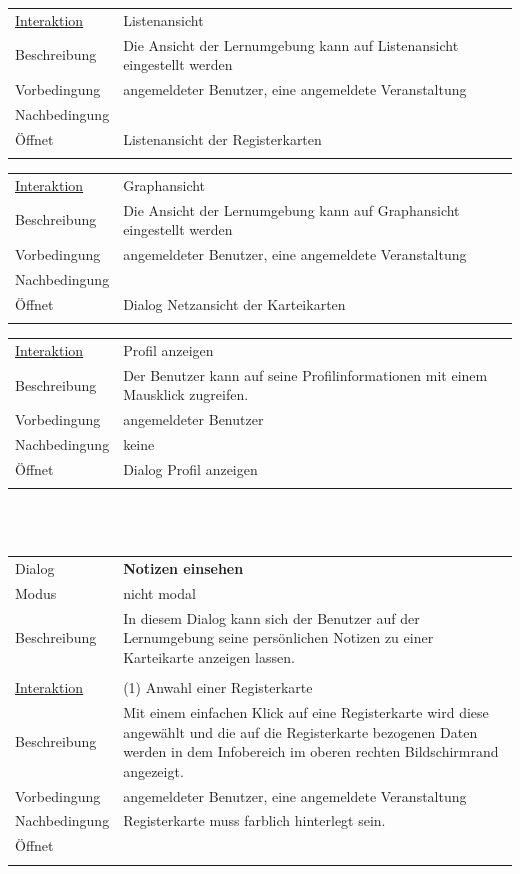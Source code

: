 \documentclass[12pt,a4paper]{article}
\begin{document}
{\begin{tabular}{l p{12cm}}
\underline{Interaktion}  	 & Listenansicht\\ 
Beschreibung   	 			 & Die Ansicht der Lernumgebung kann auf  Listenansicht eingestellt werden\\
Vorbedingung				 & angemeldeter Benutzer, eine angemeldete Veranstaltung \\
Nachbedingung				 & \\
Öffnet						 & \glqq Listenansicht der Registerkarten\grqq \\\\
\end{tabular}
\begin{tabular}{l p{12cm}}
\underline{Interaktion}  	 & Graphansicht\\ 
Beschreibung   				 & Die Ansicht der Lernumgebung kann auf  Graphansicht eingestellt werden  \\
Vorbedingung				 & angemeldeter Benutzer, eine angemeldete Veranstaltung \\
Nachbedingung				 & \\
Öffnet			 			 & \glqq Dialog Netzansicht der Karteikarten\grqq \\\\\end{tabular}

\begin{tabular}{l p{12cm}}
\underline{Interaktion}  	 & Profil anzeigen\\ 
Beschreibung   	 & Der Benutzer kann auf seine Profilinformationen mit einem Mausklick zugreifen. \\
Vorbedingung	 & angemeldeter Benutzer\\
Nachbedingung	 & keine \\
Öffnet			 & \glqq Dialog Profil anzeigen\grqq \\\\
\end{tabular}\\\\




\begin{tabular}{l p{12cm}}
Dialog 	 & \textbf{Notizen einsehen} \\ 
Modus & nicht modal\\ 
Beschreibung   	 & In diesem Dialog kann sich der Benutzer auf der Lernumgebung seine persönlichen Notizen zu einer Karteikarte anzeigen lassen. \\\\

\underline{Interaktion}  	 & (1) Anwahl einer Registerkarte\\ 
Beschreibung   	 			 & Mit einem einfachen Klick auf eine Registerkarte wird diese angewählt und die auf die Registerkarte bezogenen Daten werden in dem Infobereich im oberen rechten Bildschirmrand angezeigt.\\
Vorbedingung	 			 & angemeldeter Benutzer, eine angemeldete Veranstaltung \\
Nachbedingung	 			 & Registerkarte muss farblich hinterlegt sein.\\
Öffnet			 			 &  \\\\
\end{tabular}

}
\end{document}
